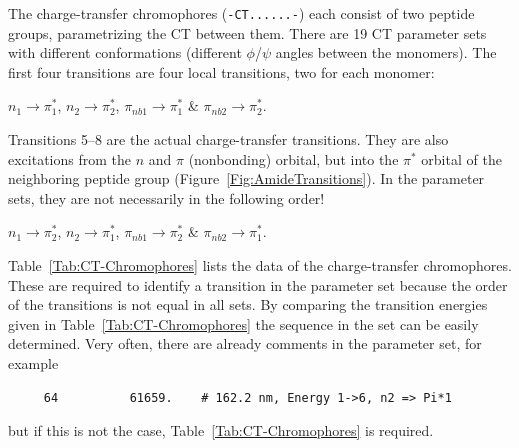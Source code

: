 \documentclass[11pt, letterpaper]{article}
\begin{document}
\label{Page:CT-parameters}

The charge-transfer chromophores (\verb'-CT......-') each consist of two peptide groups, parametrizing the CT between them. There are 19 CT parameter sets with different conformations (different $\phi$/$\psi$ angles between the monomers).\cite{Oakley:06:12414, Oakley:06:340, Bulheller:08:1866} The first four transitions are four local transitions, two for each monomer:

$n_1 \rightarrow \pi^*_1$, \hspace{3em}
$n_2 \rightarrow \pi^*_2$, \hspace{3em}
$\pi_{nb1} \rightarrow \pi^*_1$ \hspace{3em} \& \hspace{3em}
$\pi_{nb2} \rightarrow \pi^*_2$.

Transitions 5--8 are the actual charge-transfer transitions. They are also excitations from the $n$ and $\pi$ (nonbonding) orbital, but into the $\pi^*$ orbital of the neighboring peptide group (Figure~\ref{Fig:AmideTransitions}). In the parameter sets, they are not necessarily in the following order!

$n_1 \rightarrow \pi^*_2$, \hspace{3em}
$n_2 \rightarrow \pi^*_1$, \hspace{3em}
$\pi_{nb1} \rightarrow \pi^*_2$ \hspace{3em} \& \hspace{3em}
$\pi_{nb2} \rightarrow \pi^*_1$.

Table~\ref{Tab:CT-Chromophores} lists the data of the charge-transfer chromophores. These are required to identify a transition in the parameter set because the order of the transitions is not equal in all sets. By comparing the transition energies given in Table~\ref{Tab:CT-Chromophores} the sequence in the set can be easily determined. Very often, there are already comments in the parameter set, for example
\begin{verbatim}
     64          61659.    # 162.2 nm, Energy 1->6, n2 => Pi*1
\end{verbatim}
but if this is not the case, Table~\ref{Tab:CT-Chromophores} is required.
\end{document}
